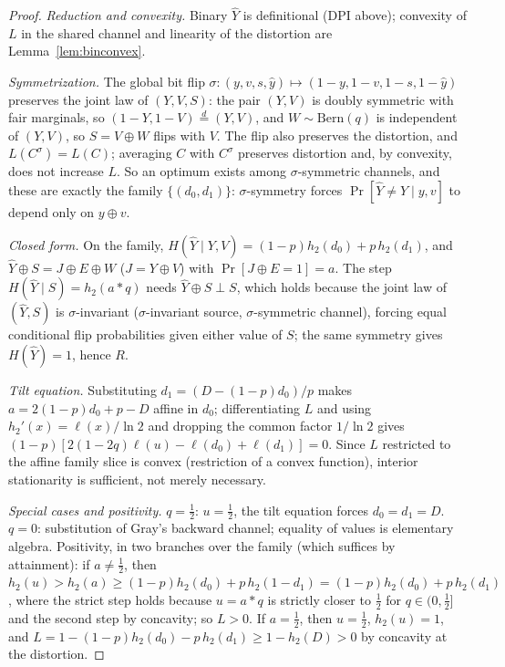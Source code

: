 \documentclass[11pt,onecolumn]{IEEEtran}
\newcommand{\hY}{\widehat{Y}}
\begin{document}
\begin{proof}
\emph{Reduction and convexity.} Binary $\hY$ is definitional (DPI
above); convexity of $L$ in the shared channel and linearity of the
distortion are Lemma~\ref{lem:binconvex}.

\emph{Symmetrization.} The global bit flip
$\sigma:(y,v,s,\hat y)\mapsto(1{-}y,1{-}v,1{-}s,1{-}\hat y)$ preserves
the joint law of $(Y,V,S)$: the pair $(Y,V)$ is doubly symmetric with
fair marginals, so $(1{-}Y,1{-}V)\overset{d}=(Y,V)$, and $W\sim
\mathrm{Bern}(q)$ is independent of $(Y,V)$, so $S=V\oplus W$ flips
with $V$. The flip also preserves the distortion, and
$L(C^\sigma)=L(C)$;
averaging $C$ with $C^\sigma$ preserves distortion and, by convexity,
does not increase $L$. So an optimum exists among $\sigma$-symmetric
channels, and these are exactly the family $\{(d_0,d_1)\}$:
$\sigma$-symmetry forces $\Pr[\hY\ne Y\mid y,v]$ to depend only on
$y\oplus v$.

\emph{Closed form.} On the family, $H(\hY\mid Y,V)=
(1-p)h_2(d_0)+p\,h_2(d_1)$, and $\hY\oplus S=J\oplus E\oplus W$
($J=Y\oplus V$) with $\Pr[J\oplus E=1]=a$. The step
$H(\hY\mid S)=h_2(a*q)$ needs $\hY\oplus S\perp S$, which holds
because the joint law of $(\hY,S)$ is $\sigma$-invariant
($\sigma$-invariant source, $\sigma$-symmetric channel), forcing equal
conditional flip probabilities given either value of $S$; the same
symmetry gives $H(\hY)=1$, hence $R$.

\emph{Tilt equation.} Substituting $d_1=(D-(1-p)d_0)/p$ makes
$a=2(1-p)d_0+p-D$ affine in $d_0$; differentiating $L$ and using
$h_2'(x)=\ell(x)/\ln2$ and dropping the common factor $1/\ln2$ gives
$(1-p)[2(1-2q)\ell(u)-\ell(d_0)+\ell(d_1)]=0$. Since $L$ restricted to
the affine family slice is convex (restriction of a convex function),
interior stationarity is sufficient, not merely necessary.

\emph{Special cases and positivity.} $q=\tfrac12$: $u=\tfrac12$, the tilt
equation forces $d_0=d_1=D$. $q=0$: substitution of Gray's backward
channel; equality of values is elementary algebra. Positivity, in two
branches over the family (which suffices by attainment): if
$a\ne\tfrac12$, then $h_2(u)>h_2(a)\ge(1-p)h_2(d_0)+p\,h_2(1-d_1)
=(1-p)h_2(d_0)+p\,h_2(d_1)$, where the strict step holds because $u=a*q$
is strictly closer to $\tfrac12$ for $q\in(0,\tfrac12]$ and the second
step by concavity; so $L>0$. If $a=\tfrac12$, then $u=\tfrac12$,
$h_2(u)=1$, and $L=1-(1-p)h_2(d_0)-p\,h_2(d_1)\ge1-h_2(D)>0$ by
concavity at the distortion.
\end{proof}
\end{document}
